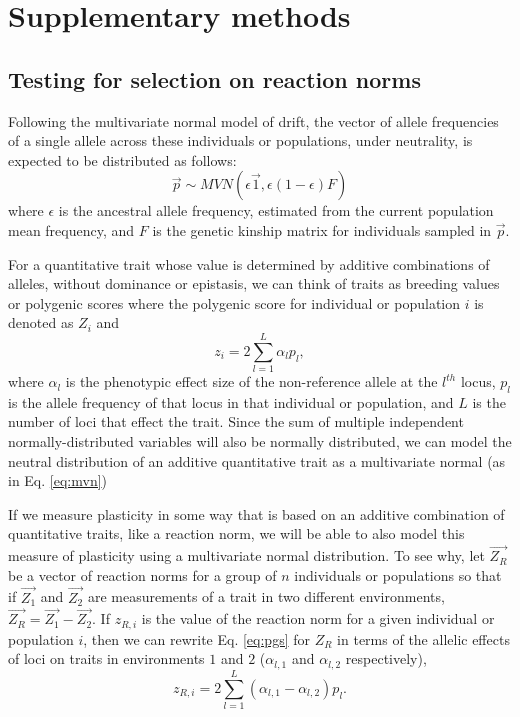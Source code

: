 \documentclass[11pt,letterpaper]{article}
\newcommand{\beginsupplement}{%
        \setcounter{table}{0}
        \renewcommand{\thetable}{S\arabic{table}}%
        \setcounter{figure}{0}
        \renewcommand{\thefigure}{S\arabic{figure}}%
}
\begin{document}



\beginsupplement

\section*{Supplementary methods}

\subsection*{Testing for selection on reaction norms}
Following the multivariate normal model of drift, the vector of allele frequencies of a single allele across these individuals or populations, under neutrality, is expected to be distributed as follows:
\begin{equation}\label{eq:mvna}
\vec{p} \sim MVN (\epsilon \vec{1}, \epsilon (1-\epsilon) F)
\end{equation}
where $\epsilon$ is the ancestral allele frequency, estimated from the current population mean frequency, and $F$ is the genetic kinship matrix for individuals sampled in $\vec{p}$.

For a quantitative trait whose value is determined by additive combinations of alleles, without dominance or epistasis, we can think of traits as breeding values or polygenic scores where the polygenic score for individual or population $i$ is denoted as $Z_{i}$ and
\begin{equation}\label{eq:pgs}
  z_{i} = 2\sum_{l=1}^{L}\alpha_{l}p_{l},
\end{equation}
where $\alpha_{l}$ is the phenotypic effect size of the non-reference allele at the $l^{th}$ locus, $p_{l}$ is the allele frequency of that locus in that individual or population, and $L$ is the number of loci that effect the trait.
Since the sum of multiple independent normally-distributed variables will also be normally distributed, we can model the neutral distribution of an additive quantitative trait as a multivariate normal (as in Eq. \ref{eq:mvn})


If we  measure plasticity in some way that is based on an additive combination of quantitative traits, like a reaction norm, we will be able to also model this measure of plasticity using a multivariate normal distribution.
To see why, let $\vec{Z_{R}}$ be a vector of reaction norms for a group of $n$ individuals or populations so that if $\vec{Z_{1}}$ and $\vec{Z_{2}}$ are measurements of a trait in two different environments, $\vec{Z_{R}} = \vec{Z_{1}} - \vec{Z_{2}}$.
If $z_{R,i }$ is the value of the reaction norm for a given individual or population $i$, then we can rewrite Eq. \ref{eq:pgs} for $Z_{R}$ in terms of the allelic effects of loci on traits in environments $1$ and $2$ ($\alpha_{l,1}$ and $\alpha_{l,2}$ respectively),
\begin{equation}
z_{R,i} = 2\sum^{L}_{l=1}(\alpha_{l,1}-\alpha_{l,2})p_{l}.
  \end{equation}
\end{document}
